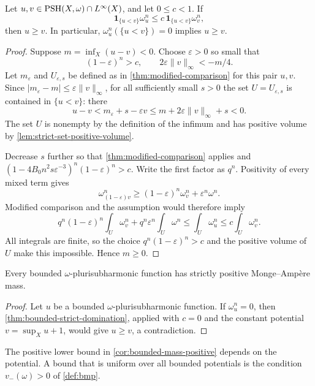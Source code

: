 \begin{theorem}\label{thm:bounded-strict-domination}
Let $u,v\in\mathrm{PSH}(X,\omega)\cap L^\infty(X)$, and let $0\leq c<1$. If
\[
 \mathbf1_{\{u<v\}}\omega_u^n
 \leq c\,\mathbf1_{\{u<v\}}\omega_v^n,
\]
then $u\geq v$. In particular, $\omega_u^n(\{u<v\})=0$ implies $u\geq v$.
\end{theorem}
\begin{proof}
Suppose $m=\inf_X(u-v)<0$. Choose $\varepsilon>0$ so small that
\[
 (1-\varepsilon)^n>c,
 \qquad 2\varepsilon\|v\|_\infty<-m/4.
\]
Let $m_\varepsilon$ and $U_{\varepsilon,s}$ be defined as in \cref{thm:modified-comparison} for this pair $u,v$. Since
$|m_\varepsilon-m|\leq\varepsilon\|v\|_\infty$, for all sufficiently small $s>0$ the set $U=U_{\varepsilon,s}$ is contained in $\{u<v\}$: there
\[
 u-v<m_\varepsilon+s-\varepsilon v
       \leq m+2\varepsilon\|v\|_\infty+s<0.
\]
The set $U$ is nonempty by the definition of the infimum and has positive volume by \cref{lem:strict-set-positive-volume}.

Decrease $s$ further so that \cref{thm:modified-comparison} applies and
$(1-4B_0n^2s\varepsilon^{-3})^n(1-\varepsilon)^n>c$. Write the first factor as $q^n$. Positivity of every mixed term gives
\[
 \omega_{(1-\varepsilon)v}^n
 \geq(1-\varepsilon)^n\omega_v^n+\varepsilon^n\omega^n.
\]
Modified comparison and the assumption would therefore imply
\[
 q^n(1-\varepsilon)^n\int_U\omega_v^n
       +q^n\varepsilon^n\int_U\omega^n
 \leq\int_U\omega_u^n\leq c\int_U\omega_v^n.
\]
All integrals are finite, so the choice $q^n(1-\varepsilon)^n>c$ and the positive volume of $U$ make this impossible. Hence $m\geq0$.
\end{proof}

\begin{corollary}\label{cor:bounded-mass-positive}
Every bounded $\omega$-plurisubharmonic function has strictly positive Monge--Amp\`ere mass.
\end{corollary}
\begin{proof}
Let $u$ be a bounded $\omega$-plurisubharmonic function. If $\omega_u^n=0$, then \cref{thm:bounded-strict-domination}, applied with $c=0$ and the constant potential $v=\sup_Xu+1$, would give $u\geq v$, a contradiction.
\end{proof}

The positive lower bound in \cref{cor:bounded-mass-positive} depends on the potential. A bound that is uniform over all bounded potentials is the condition $v_-(\omega)>0$ of \cref{def:bmp}.

